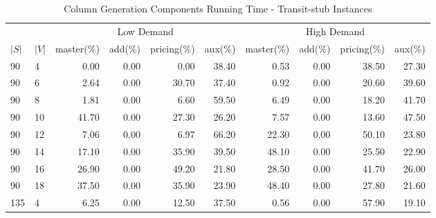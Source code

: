 \begin{table*}[h]
\begin{center}
\caption{Column Generation Components Running Time - Transit-stub Instances}\label{tab:compts}
\footnotesize
\begin{tabular} {l l | r r r r | r r r r }
\hline
     &                 &  \multicolumn{4}{c|}{Low Demand}                            & \multicolumn{4}{c}{High Demand} \\
$|S|$&           $|V|$ &  master(\%) &  add(\%)      &   pricing(\%)            &  aux(\%)     & master(\%) &            add(\%)       &             pricing(\%)  &  aux(\%) \\
\hline
90   &             4   &  0.00   &            0.00             &               0.00   &  38.40  &  0.53   &            0.00             &               38.50  &  27.30  \\
90   &             6   &  2.64   &            0.00             &               30.70  &  37.40  &  0.92   &            0.00             &               20.60  &  39.60  \\
90   &             8   &  1.81   &            0.00             &               6.60   &  59.50  &  6.49   &            0.00             &               18.20  &  41.70  \\
90   &             10  &  41.70  &            0.00             &               27.30  &  26.20  &  7.57   &            0.00             &               13.60  &  47.50  \\
90   &             12  &  7.06   &            0.00             &               6.97   &  66.20  &  22.30  &            0.00             &               50.10  &  23.80  \\
90   &             14  &  17.10  &            0.00             &               35.90  &  39.50  &  48.10  &            0.00             &               25.50  &  22.90  \\
90   &             16  &  26.90  &            0.00             &               49.20  &  21.80  &  28.50  &            0.00             &               41.70  &  26.00  \\
90   &             18  &  37.50  &            0.00             &               35.90  &  23.90  &  48.40  &            0.00             &               27.80  &  21.60  \\
135  &             4   &  6.25   &            0.00             &               12.50  &  37.50  &  0.56   &            0.00             &               57.90  &  19.10  \\

\end{tabular}
\end{center}
\end{table*}
